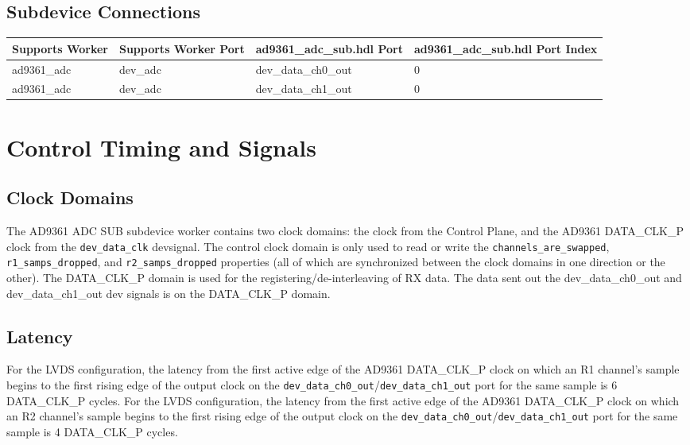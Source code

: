 \documentclass{article}
\def\comp{ad9361\_adc\_sub}
\def\Comp{AD9361 ADC SUB}
\begin{document}
\begin{landscape}
	\section*{Subdevice Connections}
	\begin{scriptsize}
		\begin{tabular}{|p{5cm}|p{5cm}|p{5cm}|p{7.23cm}|}
			\hline
			\rowcolor{blue}
			Supports Worker & Supports Worker Port & \comp{}.hdl Port     & \comp{}.hdl Port Index \\
			\hline
			ad9361\_adc     & dev\_adc             & dev\_data\_ch0\_out & 0 \\
			\hline
			ad9361\_adc     & dev\_adc             & dev\_data\_ch1\_out & 0 \\
			\hline
		\end{tabular}
	\end{scriptsize}

\end{landscape}

\section*{Control Timing and Signals}
\subsection*{Clock Domains}
The \Comp{} subdevice worker contains two clock domains: the clock from the Control Plane, and the AD9361 DATA\_CLK\_P clock from the \verb+dev_data_clk+ devsignal. The control clock domain is only used to read or write the \verb+channels_are_swapped+, \verb+r1_samps_dropped+, and \verb+r2_samps_dropped+ properties (all of which are synchronized between the clock domains in one direction or the other). The DATA\_CLK\_P domain is used for the registering/de-interleaving of RX data. The data sent out the dev\_data\_ch0\_out and dev\_data\_ch1\_out dev signals is on the DATA\_CLK\_P domain.
\subsection*{Latency}
\noindent For the LVDS configuration, the latency from the first active edge of the AD9361 DATA\_CLK\_P clock on which an R1 channel's sample begins to the first rising edge of the output clock on the \verb+dev_data_ch0_out+/\verb+dev_data_ch1_out+ port for the same sample is 6 DATA\_CLK\_P cycles. For the LVDS configuration, the latency from the first active edge of the AD9361 DATA\_CLK\_P clock on which an R2 channel's sample begins to the first rising edge of the output clock on the \verb+dev_data_ch0_out+/\verb+dev_data_ch1_out+ port for the same sample is 4 DATA\_CLK\_P cycles.
\end{document}

